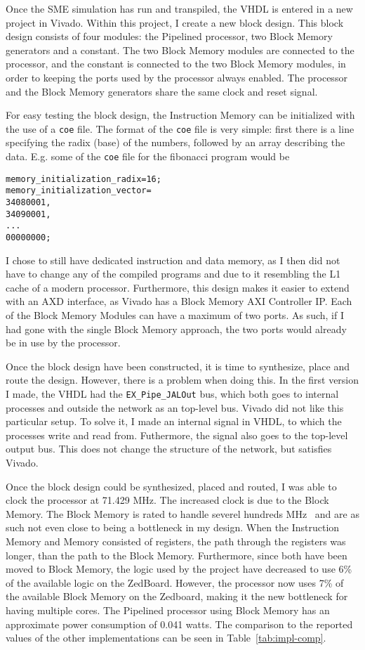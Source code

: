 Once the SME simulation has run and transpiled, the VHDL is entered in a new
project in Vivado. Within this project, I create a new block design. This block
design consists of four modules: the Pipelined processor, two Block Memory
generators and a constant. The two Block Memory modules are connected to the
processor, and the constant is connected to the two Block Memory modules, in
order to keeping the ports used by the processor always enabled. The processor
and the Block Memory generators share the same clock and reset signal.

For easy testing the block design, the Instruction Memory can be initialized
with the use of a \texttt{coe} file. The format of the \texttt{coe} file is
very simple: first there is a line specifying the radix (base) of the numbers,
followed by an array describing the data. E.g. some of the \texttt{coe} file
for the fibonacci program would be
\begin{lstlisting}
memory_initialization_radix=16;
memory_initialization_vector=
34080001,
34090001,
...
00000000;
\end{lstlisting}
I chose to still have dedicated instruction and data memory, as I then did not
have to change any of the compiled programs and due to it resembling the L1
cache of a modern processor. Furthermore, this design makes it easier to extend
with an AXD interface, as Vivado has a Block Memory AXI Controller IP. Each of
the Block Memory Modules can have a maximum of two ports. As such, if I had
gone with the single Block Memory approach, the two ports would already be in
use by the processor.

Once the block design have been constructed, it is time to synthesize, place
and route the design. However, there is a problem when doing this. In the first
version I made, the VHDL had the \texttt{EX\_Pipe\_JALOut} bus, which both goes
to internal processes and outside the network as an top-level bus. Vivado did
not like this particular setup. To solve it, I made an internal signal in VHDL,
to which the processes write and read from. Futhermore, the signal also goes to
the top-level output bus. This does not change the structure of the network,
but satisfies Vivado.

Once the block design could be synthesized, placed and routed, I was able to
clock the processor at 71.429 MHz. The increased clock is due to the Block
Memory. The Block Memory is rated to handle severel hundreds MHz~\cite{ref:bram}
and are as such not even close to being a bottleneck in my design. When the
Instruction Memory and Memory consisted of registers, the path through the
registers was longer, than the path to the Block Memory. Furthermore, since
both have been moved to Block Memory, the logic used by the project have
decreased to use 6\% of the available logic on the ZedBoard. However, the
processor now uses 7\% of the available Block Memory on the Zedboard, making it
the new bottleneck for having multiple cores. The Pipelined processor using
Block Memory has an approximate power consumption of 0.041 watts. The
comparison to the reported values of the other implementations can be seen in
Table~\ref{tab:impl-comp}.

